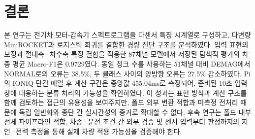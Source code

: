 \documentclass[11pt,a4paper]{article}
\begin{document}
\section{결론}
본 연구는 전기차 모터-감속기 스펙트로그램을 다센서 특징 시계열로 구성하고, 다변량 MiniROCKET과 로지스틱 회귀를 결합한 경량 진단 구조를 분석하였다.
입력 표현의 보정과 절대축·차수축 특징 결합을 적용한 87채널 모델에서 저장된 탐색적 평가의 차종 평균 Macro-F1은 0.9729였다.
동일 청크 수를 사용하는 51채널 대비 DEMAG에서 NORMAL로의 오류는 38.5\%, 두 클래스 사이의 양방향 오류는 27.5\% 감소하였다.
Pi의 IONIQ 단건 예열 후 계산 구간은 중앙값 455.04ms로 측정되어, 준비된 10초 입력 창에 대응하는 분류 처리의 가능성을 확인하였다.
이 성과는 표현 방식과 계산 구조를 함께 검토하는 접근의 유용성을 보여주지만, 폴드 외부 변환 적합과 미측정 전처리 때문에 독립 일반화와 종단 간 실시간성의 증거로 확대할 수 없다.
후속 연구는 폴드 내부 전체 파이프라인 적합, 차종·운전 조건 간 외부 검증 및 센서 입력부터 판정까지의 지연·전력 측정을 통해 실제 차량 적용 가능성을 검증해야 한다.
\end{document}
